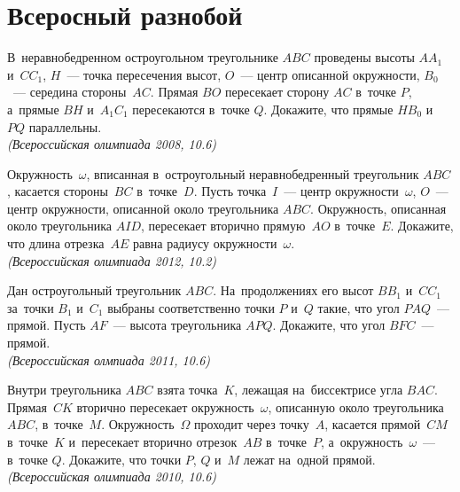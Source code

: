 

\section*{Всеросный разнобой}


\begin{problems}

\item
В~неравнобедренном остроугольном треугольнике $ABC$ проведены высоты
$A A_1$ и~$C C_1$, $H$~— точка пересечения высот, $O$~— центр описанной
окружности, $B_0$~— середина стороны~$AC$.
Прямая $BO$ пересекает сторону $AC$ в~точке $P$, а~прямые $BH$ и~$A_1C_1$
пересекаются в~точке $Q$.
Докажите, что прямые $HB_0$ и~$PQ$ параллельны.
\\\emph{(Всероссийская олимпиада 2008, 10.6)}

\item
Окружность~$\omega$, вписанная в~остроугольный неравнобедренный треугольник
$ABC$, касается стороны~$BC$ в~точке~$D$.
Пусть точка~$I$~— центр окружности~$\omega$, $O$~— центр окружности,
описанной около треугольника $ABC$.
Окружность, описанная около треугольника $AID$, пересекает вторично прямую~$AO$
в~точке~$E$.
Докажите, что длина отрезка~$AE$ равна радиусу окружности~$\omega$.
\\\emph{(Всероссийская олимпиада 2012, 10.2)}

\item
Дан остроугольный треугольник $ABC$.
На~продолжениях его высот $B B_1$ и~$C C_1$ за~точки $B_1$ и~$C_1$ выбраны
соответственно точки $P$ и~$Q$ такие, что угол $PAQ$~— прямой.
Пусть $AF$~— высота треугольника $APQ$.
Докажите, что угол $BFC$~— прямой.
\\\emph{(Всероссийская олмпиада 2011, 10.6)}

\item
Внутри треугольника $ABC$ взята точка~$K$, лежащая на~биссектрисе угла $BAC$.
Прямая~$CK$ вторично пересекает окружность~$\omega$, описанную около
треугольника $ABC$, в~точке~$M$.
Окружность~$\Omega$ проходит через точку~$A$, касается прямой~$CM$ в~точке~$K$
и~пересекает вторично отрезок~$AB$ в~точке~$P$, а~окружность~$\omega$~—
в~точке $Q$.
Докажите, что точки $P$, $Q$ и~$M$ лежат на~одной прямой.
\\\emph{(Всероссийская олимпиада 2010, 10.6)}


\end{problems}

